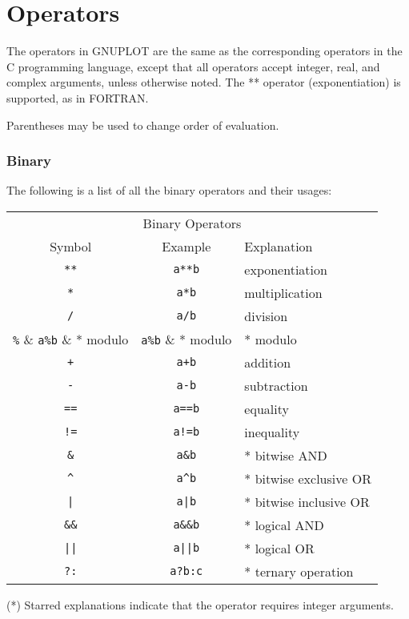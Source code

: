 \section{Operators}
The operators in GNUPLOT are the same as the corresponding operators
in the C programming language, except that all operators accept
integer, real, and complex arguments, unless otherwise noted.
The ** operator (exponentiation) is supported, as in FORTRAN.

Parentheses may be used to change order of evaluation.



\bye
\subsubsection{Binary}
The following is a list of all the binary operators and their
usages:


\begin{center}
\begin{tabular}{|ccl|} \hline
\multicolumn{3}{|c|}{Binary Operators} \\
Symbol & Example & Explanation \\ \hline
\verb~**~ & \verb~a**b~ & exponentiation\\
\verb~*~ & \verb~a*b~ & multiplication\\
\verb~/~ & \verb~a/b~ & division\\
\verb~%~ & \verb~a%b~ & * modulo\\
\verb~+~ & \verb~a+b~ & addition\\
\verb~-~ & \verb~a-b~ & subtraction\\
\verb~==~ & \verb~a==b~ & equality\\
\verb~!=~ & \verb~a!=b~ & inequality\\
\verb~&~ & \verb~a&b~ & * bitwise AND\\
\verb~^~ & \verb~a^b~ & * bitwise exclusive OR\\
\verb~|~ & \verb~a|b~ & * bitwise inclusive OR\\
\verb~&&~ & \verb~a&&b~ & * logical AND\\
\verb~||~ & \verb~a||b~ & * logical OR\\
\verb~?:~ & \verb~a?b:c~ & * ternary operation\\
\hline
\end{tabular}
\end{center}
(*) Starred explanations indicate that the operator requires
integer arguments.

